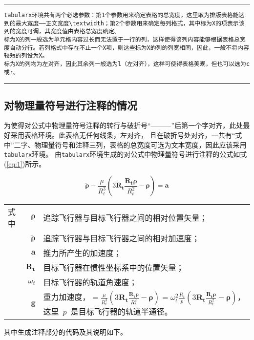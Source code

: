 \noindent\hrule
\begin{verbatim}
tabularx环境共有两个必选参数：第1个参数用来确定表格的总宽度，这里取为排版表格能达到的最大宽度——正文宽度\textwidth；第2个参数用来确定每列格式，其中标为X的项表示该列的宽度可调，其宽度值由表格总宽度确定。
标为X的列一般选为单元格内容过长而无法置于一行的列，这样使得该列内容能够根据表格总宽度自动分行。若列格式中存在不止一个X项，则这些标为X的列的列宽相同，因此，一般不将内容较短的列设为X。
标为X的列均为左对齐，因此其余列一般选为l（左对齐），这样可使得表格美观，但也可以选为c或r。
\end{verbatim}

\noindent\hrule
\subsection{对物理量符号进行注释的情况}
为使得对公式中物理量符号注释的转行与破折号“———”后第一个字对齐，此处最好采用表格环境。此表格无任何线条，左对齐，
且在破折号处对齐，一共有“式中”二字、物理量符号和注释三列，表格的总宽度可选为文本宽度，因此应该采用\verb|tabularx|环境。
由\verb|tabularx|环境生成的对公式中物理量符号进行注释的公式如式(\ref{eq:1})所示。

\begin{equation}\label{eq:1}
\ddot{\boldsymbol{\rho}}-\frac{\mu}{R_{t}^{3}}\left(3\mathbf{R_{t}}\frac{\mathbf{R_{t}\rho}}{R_{t}^{2}}-\boldsymbol{\rho}\right)=\mathbf{a}
\end{equation}

\begin{tabularx}{\textwidth}{@{}l@{\quad}r@{———}X@{}}
式中& $\bm{\rho}$ &追踪飞行器与目标飞行器之间的相对位置矢量；\\
&  $\bm{\ddot{\rho}}$&追踪飞行器与目标飞行器之间的相对加速度；\\
&  $\mathbf{a}$   &推力所产生的加速度；\\
&  $\mathbf{R_t}$ & 目标飞行器在惯性坐标系中的位置矢量；\\
&  $\omega_{t}$ & 目标飞行器的轨道角速度；\\
&  $\mathbf{g}$ & 重力加速度，$=\frac{\mu}{R_{t}^{3}}\left(
3\mathbf{R_{t}}\frac{\mathbf{R_{t}\rho}}{R_{t}^{2}}-\bm{\rho}\right)=\omega_{t}^{2}\frac{R_{t}}{p}\left(
3\mathbf{R_{t}}\frac{\mathbf{R_{t}\rho}}{R_{t}^{2}}-\bm{\rho}\right)$，这里~$p$~是目标飞行器的轨道半通径。
\end{tabularx}
\vspace{\wordsep}

其中生成注释部分的代码及其说明如下。

